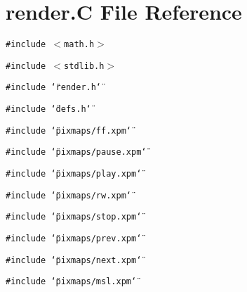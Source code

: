 \section{render.C File Reference}
\label{render_8C}
{\tt \#include $<$math.h$>$}\par
{\tt \#include $<$stdlib.h$>$}\par
{\tt \#include \char`\"{}render.h\char`\"{}}\par
{\tt \#include \char`\"{}defs.h\char`\"{}}\par
{\tt \#include \char`\"{}pixmaps/ff.xpm\char`\"{}}\par
{\tt \#include \char`\"{}pixmaps/pause.xpm\char`\"{}}\par
{\tt \#include \char`\"{}pixmaps/play.xpm\char`\"{}}\par
{\tt \#include \char`\"{}pixmaps/rw.xpm\char`\"{}}\par
{\tt \#include \char`\"{}pixmaps/stop.xpm\char`\"{}}\par
{\tt \#include \char`\"{}pixmaps/prev.xpm\char`\"{}}\par
{\tt \#include \char`\"{}pixmaps/next.xpm\char`\"{}}\par
{\tt \#include \char`\"{}pixmaps/msl.xpm\char`\"{}}\par
